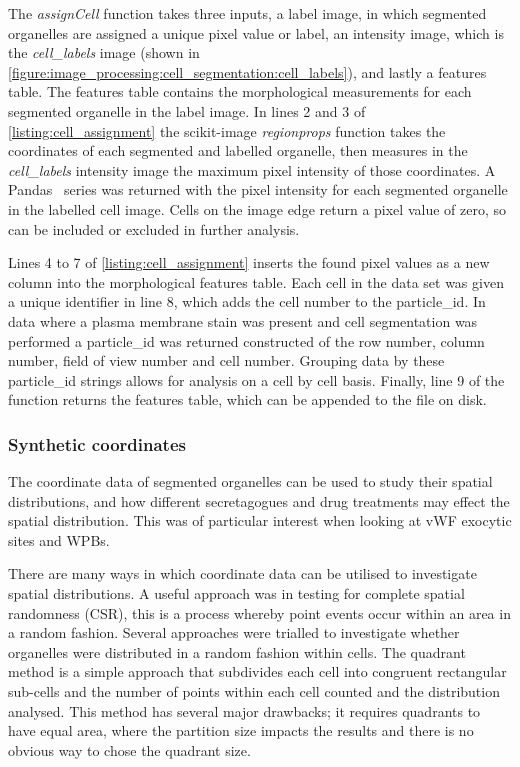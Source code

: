 The \emph{assignCell} function takes three inputs, a label image, in which segmented organelles are assigned a unique pixel value or label, an intensity image, which is the \emph{cell\_labels} image (shown in \autoref{figure:image_processing:cell_segmentation:cell_labels}), and lastly a features table. The features table contains the morphological measurements for each segmented organelle in the label image. In lines 2 and 3 of \autoref{listing:cell_assignment} the scikit-image \emph{regionprops} function takes the coordinates of each segmented and labelled organelle, then measures in the \emph{cell\_labels} intensity image the maximum pixel intensity of those coordinates. A Pandas~\cite{McKinney2011} series was returned with the pixel intensity for each segmented organelle in the labelled cell image. Cells on the image edge return a pixel value of zero, so can be included or excluded in further analysis.

Lines 4 to 7 of \autoref{listing:cell_assignment} inserts the found pixel values as a new column into the morphological features table. Each cell in the data set was given a unique identifier in line 8, which adds the cell number to the particle\_id. In data where a plasma membrane stain was present and cell segmentation was performed a particle\_id was returned constructed of the row number, column number, field of view number and cell number. Grouping data by these particle\_id strings allows for analysis on a cell by cell basis. Finally, line 9 of the function returns the features table, which can be appended to the file on disk.

\subsubsection{Synthetic coordinates}
\label{endothelial_morphometry:image_processing:synthetic_coordinates}
The coordinate data of segmented organelles can be used to study their spatial distributions, and how different secretagogues and drug treatments may effect the spatial distribution. This was of particular interest when looking at vWF exocytic sites and WPBs.

There are many ways in which coordinate data can be utilised to investigate spatial distributions. A useful approach was in testing for complete spatial randomness (CSR), this is a process whereby point events occur within an area in a random fashion. Several approaches were trialled to investigate whether organelles were distributed in a random fashion within cells. The quadrant method is a simple approach that subdivides each cell into congruent rectangular sub-cells and the number of points within each cell counted and the distribution analysed. This method has several major drawbacks; it requires quadrants to have equal area, where the partition size impacts the results and there is no obvious way to chose the quadrant size.

